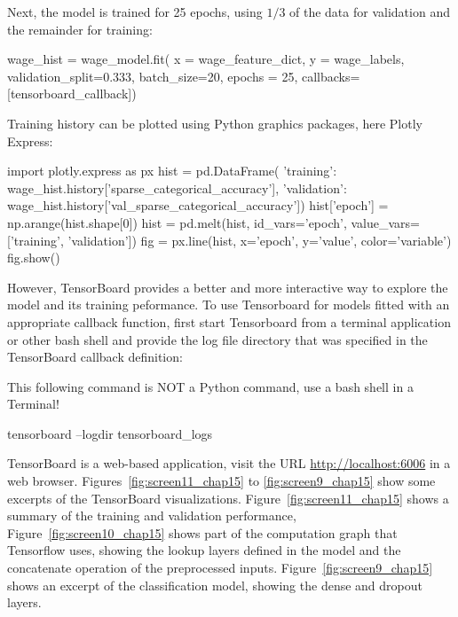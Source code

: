 Next, the model is trained for 25 epochs, using $1/3$ of the data for validation and the remainder for training:

\begin{pythoncode}
wage_hist = wage_model.fit(
    x = wage_feature_dict,
    y = wage_labels,
    validation_split=0.333,
    batch_size=20,
    epochs = 25,
    callbacks=[tensorboard_callback])
\end{pythoncode}

Training history can be plotted using Python graphics packages, here Plotly Express:

\begin{pythoncode}
import plotly.express as px
hist = pd.DataFrame({
    'training': 
        wage_hist.history['sparse_categorical_accuracy'],
    'validation': 
        wage_hist.history['val_sparse_categorical_accuracy']})
hist['epoch'] = np.arange(hist.shape[0])
hist = pd.melt(hist, id_vars='epoch', 
                     value_vars=['training', 'validation'])
fig = px.line(hist, x='epoch', y='value', color='variable')
fig.show()
\end{pythoncode}

However, TensorBoard provides a better and more interactive way to explore the model and its training peformance. To use Tensorboard for models fitted with an appropriate callback function, first start Tensorboard from a terminal application or other bash shell and provide the log file directory that was specified in the TensorBoard callback definition:

\begin{alertbox}
\small
This following command is NOT a Python command, use a bash shell in a Terminal!
\normalsize
\end{alertbox}

\begin{bashcode}
tensorboard --logdir tensorboard_logs
\end{bashcode}

\noindent TensorBoard is a web-based application, visit the URL \url{http://localhost:6006} in a web browser. Figures~\ref{fig:screen11_chap15} to \ref{fig:screen9_chap15} show some excerpts of the TensorBoard visualizations. Figure~\ref{fig:screen11_chap15} shows a summary of the training and validation performance, Figure~\ref{fig:screen10_chap15} shows part of the computation graph that Tensorflow uses, showing the lookup layers defined in the model and the concatenate operation of the preprocessed inputs. Figure~\ref{fig:screen9_chap15} shows an excerpt of the classification model, showing the dense and dropout layers.

